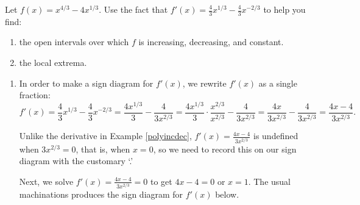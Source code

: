 \documentclass{ximera}
\begin{document}
\begin{example} \label{powerfcnincdec} Let $f(x) = x^{4/3} - 4x^{1/3}$. Use the fact that $f'(x) = \frac{4}{3} x^{1/3} - \frac{4}{3} x^{-2/3}$ to help you find:

\begin{enumerate}

\item the open intervals over which $f$ is increasing, decreasing, and constant.

\item the local extrema.

\end{enumerate}

\begin{explanation}    \begin{enumerate}  \item In order to make a sign diagram for $f'(x)$, we rewrite $f'(x)$ as a single fraction:  \[f'(x) = \dfrac{4}{3} x^{1/3} - \dfrac{4}{3} x^{-2/3} =  \dfrac{4x^{1/3}}{3}  - \dfrac{4}{3x^{2/3}}  = \dfrac{4x^{1/3}}{3} \cdot \dfrac{x^{2/3}}{x^{2/3}} - \dfrac{4}{3x^{2/3}} = \dfrac{4x}{3x^{2/3}} - \dfrac{4}{3x^{2/3}}   = \dfrac{4x-4}{3x^{2/3}}.\]



Unlike the derivative in Example \ref{polyincdec}, $f'(x) =  \frac{4x-4}{3x^{2/3}}$ is undefined when $3x^{2/3} = 0$, that is, when $x = 0$, so we need to record this on our sign diagram with the customary `\textinterrobang.' 

Next, we solve  $f'(x) =  \frac{4x-4}{3x^{2/3}} = 0$ to get $4x-4 = 0$ or $x = 1$. The usual machinations produces the  sign diagram for $f'(x)$ below.

\begin{image}
\end{image}



\end{enumerate}
\end{explanation}
\end{example}
\end{document}
